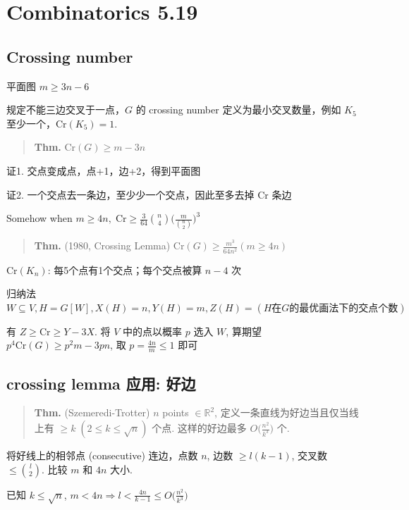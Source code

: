 \chapter{Combinatorics 5.19}
\label{ch:250519}

\section{Crossing number}

平面图 $m\geq 3n-6$

规定不能三边交叉于一点，$G$ 的 crossing number 定义为最小交叉数量，例如 $K_5$ 至少一个，$\text{Cr}(K_5)=1$.

\begin{quotation}
\textbf{Thm.} $\text{Cr}(G)\geq m-3n$
\end{quotation}

证1. 交点变成点，点+1，边+2，得到平面图

证2. 一个交点去一条边，至少少一个交点，因此至多去掉 $\text{Cr}$ 条边

Somehow when $m\geq 4n, \;\text{Cr}\geq\frac{3}{64}{n\choose 4}\Big(\frac{m}{{n\choose 2}}\Big)^3$

\begin{quotation}
\textbf{Thm.} (1980, Crossing Lemma) $\text{Cr}(G)\geq\frac{m^3}{64n^2}(m\geq 4n)$
\end{quotation}

$\text{Cr}(K_n)$: 每5个点有1个交点；每个交点被算 $n-4$ 次

归纳法 $W\subseteq V,H=G[W],X(H)=n,Y(H)=m,Z(H)=(H\text{在}G\text{的最优画法下的交点个数})$

有 $Z\geq \text{Cr}\geq Y-3X$. 将 $V$ 中的点以概率 $p$ 选入 $W$, 算期望 $p^4\text{Cr}(G)\geq p^2m-3pn$, 取 $p=\frac{4n}{m}\leq1$ 即可

\section{crossing lemma 应用: 好边}

\begin{quotation}
\textbf{Thm.} (Szemeredi-Trotter) $n$ points $\in\mathbb{R}^2$, 定义一条直线为好边当且仅当线上有 $\geq k\;(2\leq k\leq \sqrt{n})$ 个点. 这样的好边最多 $O\big(\frac{n^2}{k^3}\big)$ 个.
\end{quotation}

将好线上的相邻点 (consecutive) 连边，点数 $n$, 边数 $\geq l(k-1)$, 交叉数 $\leq{l\choose 2}$. 比较 $m$ 和 $4n$ 大小.

已知 $k\leq \sqrt{n}$, $m<4n\Rightarrow l<\frac{4n}{k-1}\leq O\big(\frac{n^2}{k^3}\big)$

